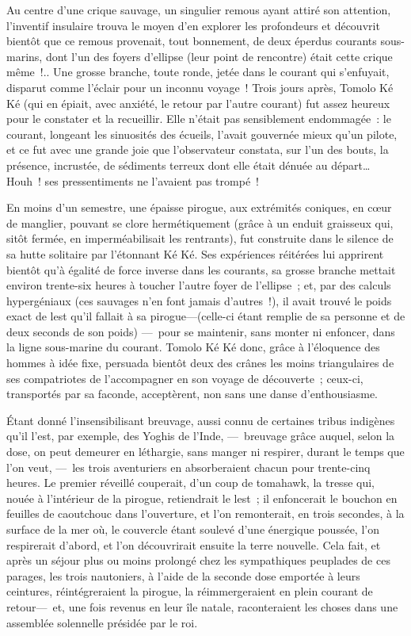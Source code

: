 \documentclass[french,twoside]{book} %
\begin{document}
Au centre d’une crique sauvage, un singulier remous ayant attiré son attention, l’inventif insulaire trouva le moyen d’en explorer les profondeurs et découvrit bientôt que ce remous provenait, tout bonnement, de deux éperdus courants sous-marins, dont l’un des foyers d’ellipse (leur point de rencontre) était cette crique même !.. Une grosse branche, toute ronde, jetée dans le courant qui s’enfuyait, disparut comme l’éclair pour un inconnu voyage ! Trois jours après, Tomolo Ké Ké (qui en épiait, avec anxiété, le retour par l’autre courant) fut assez heureux pour le constater et la recueillir. Elle n’était pas sensiblement endommagée : le courant, longeant les sinuosités des écueils, l’avait gouvernée mieux qu’un pilote, et ce fut avec une grande joie que l’observateur constata, sur l’un des bouts, la présence, incrustée, de sédiments terreux dont elle était dénuée au départ… Houh ! ses pressentiments ne l’avaient pas trompé !\par
En moins d’un semestre, une épaisse pirogue,   aux extrémités coniques, en cœur de manglier, pouvant se clore hermétiquement (grâce à un enduit graisseux qui, sitôt fermée, en imperméabilisait les rentrants), fut construite dans le silence de sa hutte solitaire par l’étonnant Ké Ké. Ses expériences réitérées lui apprirent bientôt qu’à égalité de force inverse dans les courants, sa grosse branche mettait environ trente-six heures à toucher l’autre foyer de l’ellipse ; et, par des calculs hypergéniaux (ces sauvages n’en font jamais d’autres !), il avait trouvé le poids exact de lest qu’il fallait à sa pirogue—(celle-ci étant remplie de sa personne et de deux seconds de son poids) — pour se maintenir, sans monter ni enfoncer, dans la ligne sous-marine du courant. Tomolo Ké Ké donc, grâce à l’éloquence des hommes à idée fixe, persuada bientôt deux des crânes les moins triangulaires de ses compatriotes de l’accompagner en son voyage de découverte ; ceux-ci, transportés par sa faconde, acceptèrent, non sans une danse d’enthousiasme.\par
Étant donné l’insensibilisant breuvage, aussi   connu de certaines tribus indigènes qu’il l’est, par exemple, des Yoghis de l’Inde, — breuvage grâce auquel, selon la dose, on peut demeurer en léthargie, sans manger ni respirer, durant le temps que l’on veut, — les trois aventuriers en absorberaient chacun pour trente-cinq heures. Le premier réveillé couperait, d’un coup de tomahawk, la tresse qui, nouée à l’intérieur de la pirogue, retiendrait le lest ; il enfoncerait le bouchon en feuilles de caoutchouc dans l’ouverture, et l’on remonterait, en trois secondes, à la surface de la mer où, le couvercle étant soulevé d’une énergique poussée, l’on respirerait d’abord, et l’on découvrirait ensuite la terre nouvelle. Cela fait, et après un séjour plus ou moins prolongé chez les sympathiques peuplades de ces parages, les trois nautoniers, à l’aide de la seconde dose emportée à leurs ceintures, réintégreraient la pirogue, la réimmergeraient en plein courant de retour— et, une fois revenus en leur île natale, raconteraient les choses dans une assemblée solennelle présidée par le roi.\par
\end{document}

